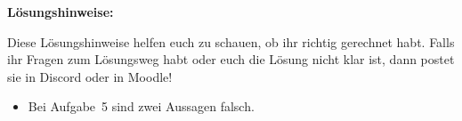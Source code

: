 \documentclass{../cssheet}
\begin{document}
\newpage

\textbf{Lösungshinweise:} 

Diese Lösungshinweise helfen euch zu schauen, ob ihr richtig gerechnet habt. Falls ihr Fragen zum Lösungsweg habt oder euch die Lösung nicht klar ist, dann postet sie in Discord oder in Moodle!

\begin{itemize}
\item Bei Aufgabe~5 sind zwei Aussagen falsch. 
\end{itemize}

\vspace*{10mm}
\printlicense

\printsocials
\end{document}
